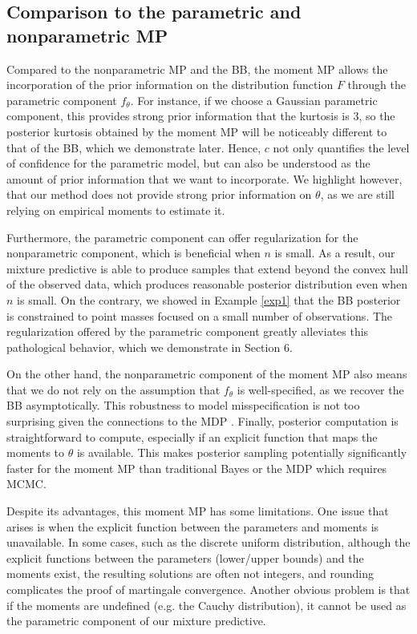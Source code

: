 \documentclass[11pt,a4paper]{article}
\theoremstyle{plain}
\theoremstyle{remark}
\theoremstyle{remark}
\begin{document}
\subsection{Comparison to the parametric and nonparametric MP}


Compared to the nonparametric MP and the BB, the moment MP allows the incorporation of the prior information on the distribution function $F$ through the parametric component $f_\theta$. For instance, if we choose a Gaussian parametric component, this provides strong prior information that the kurtosis is 3, so the posterior kurtosis obtained by the moment MP will be noticeably different to that of the BB, which we demonstrate later. Hence, $c$ not only quantifies the level of confidence for the parametric model, but can also be understood as the amount of prior information that we want to incorporate. We highlight however, that our method does not provide strong prior information on $\theta$, as we are still relying on empirical moments to estimate it.

Furthermore, the parametric component can offer regularization for the nonparametric component, which is beneficial when $n$ is small.
As a result, our mixture predictive is able to produce samples that extend beyond the convex hull of the observed data, which produces reasonable posterior distribution even when $n$ is small. On the contrary, we showed in Example \ref{exp1} that the BB posterior is constrained to point masses focused on a small number of observations. The regularization offered by the parametric component greatly alleviates this pathological behavior, which we demonstrate in Section 6.

On the other hand, the nonparametric component of the moment MP also means that we do not rely on the assumption that $f_\theta$ is well-specified, as we recover the BB asymptotically. This robustness to model misspecification is not too surprising given the connections to the MDP \citep{Antoniak1974,Lyddon2018}. Finally, posterior computation is straightforward to compute, especially if an explicit function that maps the moments to $\theta$ is available. This makes posterior sampling potentially significantly faster for the moment MP than traditional Bayes or the MDP which requires MCMC. 


Despite its advantages, this moment MP has some limitations. One issue that arises is when the explicit function between the parameters and moments is unavailable. In some cases, such as the discrete uniform distribution, although the explicit functions between the parameters (lower/upper bounds) and the moments exist, the resulting solutions are often not integers, and rounding complicates the proof of martingale convergence. Another obvious problem is that if the moments are undefined (e.g. the Cauchy distribution), it cannot be used as the parametric component of our mixture predictive.
\end{document}
